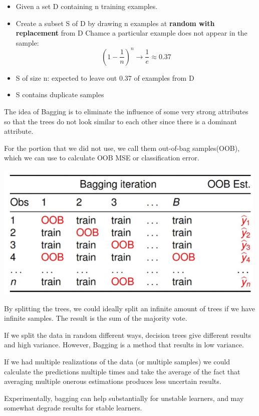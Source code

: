 \documentclass[letterpaper,12pt]{article}
\begin{document}
\begin{itemize}
    \item Given a set D containing n training examples. 
    \item Create a subset S of D by drawing n examples at \textbf{random with replacement} from D
    Chamce a particular example does not appear in the sample:
    \[(1-\frac{1}{n})^n \to \frac{1}{e} \approx 0.37 \]
    \item S of size n: expected to leave out 0.37 of examples from D
    \item S contains duplicate samples
\end{itemize}

The idea of Bagging is to eliminate the influence of some very strong attributes so that the trees do not look similar to each other since there is a dominant attribute. 

For the portion that we did not use, we call them out-of-bag samples(OOB), which we can use to calculate OOB MSE or classification error. 

\includegraphics*{./Image/Out of bag estimate.png}

By splitting the trees, we could ideally split an infinite amount of trees if we have infinite samples. The result is the sum of the majority vote. 

If we split the data in random different ways, decision trees give different results and high variance. However, Bagging is a method that results in low variance. 

If we had multiple realizations of the data (or multiple samples) we could calculate the predictions multiple times and take the average of the fact that averaging multiple onerous estimations produces less uncertain results.

Experimentally, bagging can help substantially for unstable learners, and may somewhat degrade results for stable learners.
\end{document}

